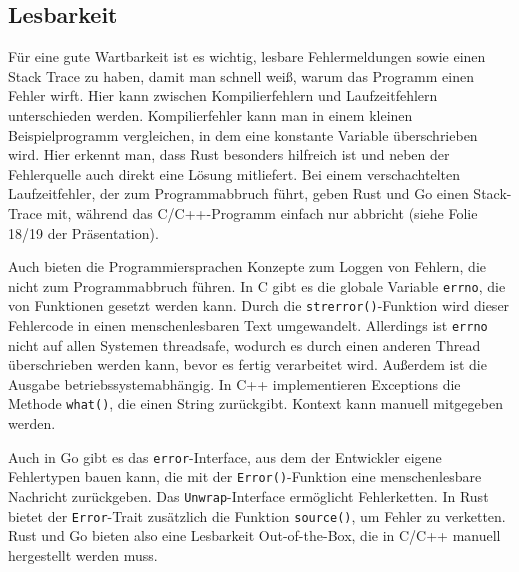 \begin{figure}[htp]
	\centering
	
	\label{fig:catch_unwind}
\end{figure}

\subsection{Lesbarkeit}
Für eine gute Wartbarkeit ist es wichtig, lesbare Fehlermeldungen sowie einen Stack Trace zu haben, damit man schnell weiß, warum das Programm einen Fehler wirft. Hier kann zwischen Kompilierfehlern und Laufzeitfehlern unterschieden werden. Kompilierfehler kann man in einem kleinen Beispielprogramm vergleichen, in dem eine konstante Variable überschrieben wird. Hier erkennt man, dass Rust besonders hilfreich ist und neben der Fehlerquelle auch direkt eine Lösung mitliefert. Bei einem verschachtelten Laufzeitfehler, der zum Programmabbruch führt, geben Rust und Go einen Stack-Trace mit, während das C/C++-Programm einfach nur abbricht (siehe Folie 18/19 der Präsentation).

Auch bieten die Programmiersprachen Konzepte zum Loggen von Fehlern, die nicht zum Programmabbruch führen. In C gibt es die globale Variable \texttt{errno}, die von Funktionen gesetzt werden kann. Durch die \texttt{strerror()}-Funktion wird dieser Fehlercode in einen menschenlesbaren Text umgewandelt. Allerdings ist \texttt{errno} nicht auf allen Systemen threadsafe, wodurch es durch einen anderen Thread überschrieben werden kann, bevor es fertig verarbeitet wird. Außerdem ist die Ausgabe betriebssystemabhängig. In C++ implementieren Exceptions die Methode \texttt{what()}, die einen String zurückgibt. Kontext kann manuell mitgegeben werden.

\begin{figure}[htp]
	\centering
	
	\label{fig:errno}
\end{figure}

\begin{figure}[htp]
	\centering
	
	\label{fig:error_c++}
\end{figure}

Auch in Go gibt es das \texttt{error}-Interface, aus dem der Entwickler eigene Fehlertypen bauen kann, die mit der \texttt{Error()}-Funktion eine menschenlesbare Nachricht zurückgeben. Das \texttt{Unwrap}-Interface ermöglicht Fehlerketten. In Rust bietet der \texttt{Error}-Trait zusätzlich die Funktion \texttt{source()}, um Fehler zu verketten. Rust und Go bieten also eine Lesbarkeit Out-of-the-Box, die in C/C++ manuell hergestellt werden muss.

